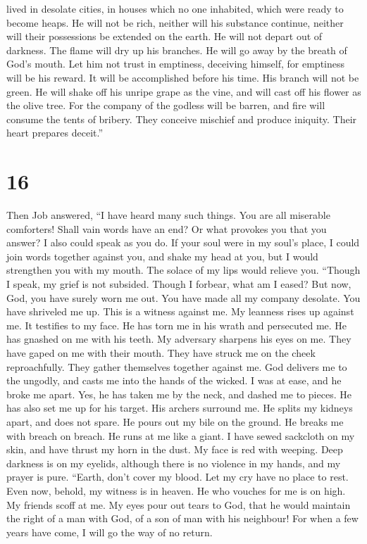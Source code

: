 lived in desolate cities, in houses which no one inhabited, which were
ready to become heaps.  He will not be rich, neither will
his substance continue, neither will their possessions be extended on
the earth.  He will not depart out of darkness. The flame
will dry up his branches. He will go away by the breath of God's mouth.
 Let him not trust in emptiness, deceiving himself, for
emptiness will be his reward.  It will be accomplished
before his time. His branch will not be green.  He will
shake off his unripe grape as the vine, and will cast off his flower as
the olive tree.  For the company of the godless will be
barren, and fire will consume the tents of bribery.  They
conceive mischief and produce iniquity. Their heart prepares deceit.''

\hypertarget{section-15}{%
\section{16}\label{section-15}}

 Then Job answered,  ``I have heard many
such things. You are all miserable comforters!  Shall vain
words have an end? Or what provokes you that you answer? 
I also could speak as you do. If your soul were in my soul's place, I
could join words together against you, and shake my head at you,
 but I would strengthen you with my mouth. The solace of
my lips would relieve you.  ``Though I speak, my grief is
not subsided. Though I forbear, what am I eased?  But now,
God, you have surely worn me out. You have made all my company desolate.
 You have shriveled me up. This is a witness against me.
My leanness rises up against me. It testifies to my face. 
He has torn me in his wrath and persecuted me. He has gnashed on me with
his teeth. My adversary sharpens his eyes on me.  They
have gaped on me with their mouth. They have struck me on the cheek
reproachfully. They gather themselves together against me.
 God delivers me to the ungodly, and casts me into the
hands of the wicked.  I was at ease, and he broke me
apart. Yes, he has taken me by the neck, and dashed me to pieces. He has
also set me up for his target.  His archers surround me.
He splits my kidneys apart, and does not spare. He pours out my bile on
the ground.  He breaks me with breach on breach. He runs
at me like a giant.  I have sewed sackcloth on my skin,
and have thrust my horn in the dust.  My face is red with
weeping. Deep darkness is on my eyelids,  although there
is no violence in my hands, and my prayer is pure. 
``Earth, don't cover my blood. Let my cry have no place to rest.
 Even now, behold, my witness is in heaven. He who
vouches for me is on high.  My friends scoff at me. My
eyes pour out tears to God,  that he would maintain the
right of a man with God, of a son of man with his neighbour!
 For when a few years have come, I will go the way of no
return.

